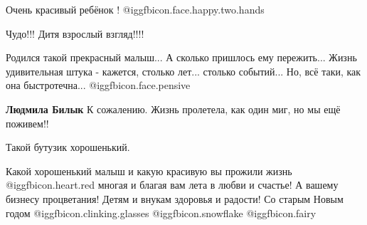  
 
 
 
 

Очень красивый ребёнок ! @igg{fbicon.face.happy.two.hands} 

Чудо!!! Дитя взрослый взгляд!!!!


Родился такой прекрасный малыш... А сколько пришлось ему пережить... Жизнь
удивительная штука - кажется, столько лет... столько событий... Но, всё таки,
как она быстротечна...  @igg{fbicon.face.pensive} 

\textbf{Людмила Билык} К сожалению. Жизнь пролетела, как один миг, но мы ещё поживем!!

Такой бутузик хорошенький.


Какой хорошенький малыш и какую красивую вы прожили жизнь
@igg{fbicon.heart.red} многая и благая вам лета в любви и счастье! А вашему
бизнесу процветания! Детям и внукам здоровья и радости! Со старым Новым годом
@igg{fbicon.clinking.glasses} @igg{fbicon.snowflake} @igg{fbicon.fairy} 
